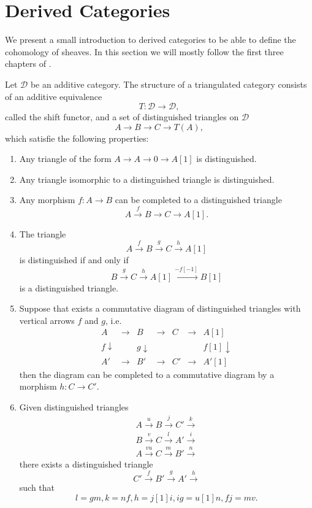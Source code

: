 \documentclass[
	oldfontcommands,
	sumario=abnt-6027-2012,
	12pt,			%
	openright,		%
	oneside,		%
	a4paper,		%
	english,		%
	brazil			%
	]{imecc-unicamp}
\begin{document}
\section{Derived Categories}

We present a small introduction to derived categories to be able to define the cohomology of sheaves. In this section we will mostly follow the first three chapters of		 \cite{huybrechts2006fourier}.
\begin{definition}Let $\mathcal D$ be an additive category. The structure of a triangulated category consists of an additive equivalence $$
	T:\mathcal D\rightarrow \mathcal D,
	$$
	called the shift functor, and a set of distinguished triangles on $\mathcal{D}$ $$
	A\rightarrow B\rightarrow C\rightarrow T(A),
	$$
	which satisfie the following properties:
	\begin{enumerate}
		\item Any triangle of the form $A\rightarrow A\rightarrow 0\rightarrow A[1]$ is distinguished.
		\item Any triangle isomorphic to a distinguished triangle is distinguished.
		\item Any morphism $f:A\rightarrow B$ can be completed to a distinguished triangle $$
		A\xrightarrow{f}B\rightarrow C\rightarrow A[1]. 
		$$
		\item The triangle $$A\xrightarrow{f}B\xrightarrow{g} C \xrightarrow h A[1]
		$$ is distinguished if and only if $$B\xrightarrow{g}C\xrightarrow{h} A[1] \xrightarrow{-f[-1]} B[1]
		$$ is a distinguished triangle.
		\item Suppose that exists a commutative diagram of distinguished triangles with vertical arrows $f$ and $g$, i.e.
		$$
		\begin{matrix}
		A&\rightarrow &B&\rightarrow&C&\rightarrow&A[1]\\ {\scriptstyle f}\downarrow&&{\scriptstyle g}\downarrow&&&&{\scriptstyle f[1]}\downarrow\\
		A'&\rightarrow &B'&\rightarrow&C'&\rightarrow&A'[1]
		\end{matrix}
		$$
		then the diagram can be completed to a commutative diagram by a morphism $h:C\rightarrow C'.$
		\item Given distinguished triangles $$
		\begin{matrix}
		A\xrightarrow u B\xrightarrow j C'\xrightarrow k\\
		B\xrightarrow v C\xrightarrow l A'\xrightarrow i \\
		A\xrightarrow{vu}  C\xrightarrow m B'\xrightarrow n
		\end{matrix}
		$$
		there exists a distinguished triangle $$
		C'\xrightarrow f B'\xrightarrow g A'\xrightarrow h
		$$ such that
		$$
		l=gm, k=nf, h=j[1]i, ig=u[1]n, fj=mv.
		$$
	\end{enumerate}
\end{definition}
\end{document}

